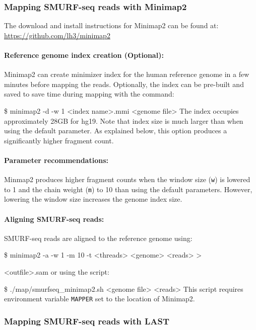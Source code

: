\documentclass[11pt]{article}
\newenvironment{cmd}
{\list{}{
    \parsep=0em
    \itemindent=17pt
    \listparindent=50pt
    \leftmargin=0in
    \rightmargin=0in
  }\item[] \ttfamily \$}
{\endlist}
\begin{document}
\subsubsection{Mapping SMURF-seq reads with Minimap2}
\label{minimap}

The download and install instructions for Minimap2 can be found at:
\url{https://github.com/lh3/minimap2}

\paragraph{Reference genome index creation (Optional):}
Minimap2 can create minimizer index for the human reference genome in
a few minutes before mapping the reads. Optionally, the
index can be pre-built and saved to save time during mapping with
the command:
\begin{cmd}
  minimap2 -d -w 1 <index name>.mmi <genome file>
\end{cmd}
The index occupies approximately 28GB for hg19. Note that index size
is much larger than when using the default parameter. As explained below,
this option produces a significantly higher fragment count.

\paragraph{Parameter recommendations:}
Minmap2 produces higher fragment counts when the window size (\texttt{w}) 
is lowered to 1 and the chain weight (\texttt{m}) to 10 than using the
default parameters. However, lowering the window size increases the
genome index size.


\paragraph{Aligning SMURF-seq reads:}
SMURF-seq reads are aligned to the reference genome using:
\begin{cmd}
  minimap2 -a -w 1 -m 10 -t <threads> <genome> <reads> >
    \par <outfile>.sam
\end{cmd}
or using the script:
\begin{cmd}
  ./map/smurfseq\_minimap2.sh <genome file> <reads>
\end{cmd}
This script requires environment variable \texttt{MAPPER} set to the
location of Minimap2.

\subsubsection{Mapping SMURF-seq reads with LAST}
\label{last}
\end{document}
